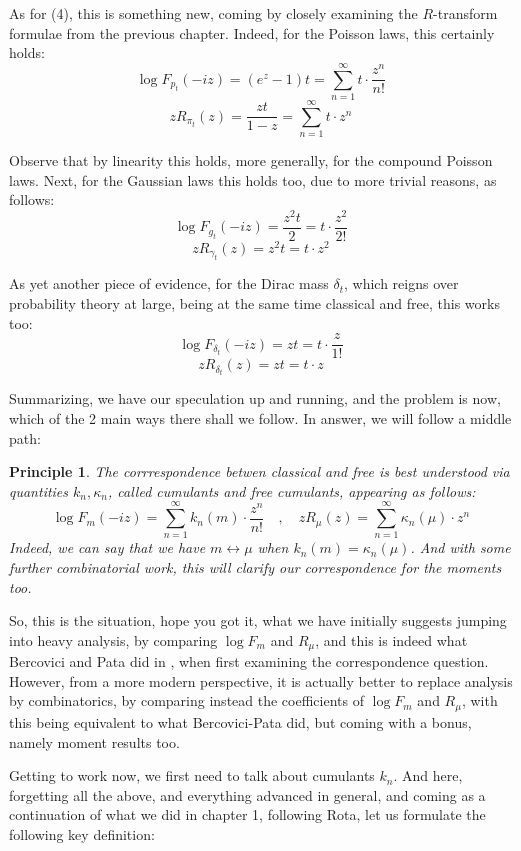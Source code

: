 \documentclass[12pt]{amsbook}
\newtheorem{principle}[theorem]{Principle}
\begin{document}
\bigskip

As for (4), this is something new, coming by closely examining the $R$-transform formulae from the previous chapter. Indeed, for the Poisson laws, this certainly holds:
$$\log F_{p_t}(-iz)=(e^z-1)t=\sum_{n=1}^\infty t\cdot\frac{z^n}{n!}$$
$$zR_{\pi_t}(z)=\frac{zt}{1-z}=\sum_{n=1}^\infty t\cdot z^n$$

Observe that by linearity this holds, more generally, for the compound Poisson laws. Next, for the Gaussian laws this holds too, due to more trivial reasons, as follows:
$$\log F_{g_t}(-iz)=\frac{z^2t}{2}=t\cdot\frac{z^2}{2!}$$
$$zR_{\gamma_t}(z)=z^2t=t\cdot z^2$$

As yet another piece of evidence, for the Dirac mass $\delta_t$, which reigns over probability theory at large, being at the same time classical and free, this works too:
$$\log F_{\delta_t}(-iz)=zt=t\cdot\frac{z}{1!}$$
$$zR_{\delta_t}(z)=zt=t\cdot z$$

Summarizing, we have our speculation up and running, and the problem is now, which of the 2 main ways there shall we follow. In answer, we will follow a middle path:

\begin{principle}
The corrrespondence betwen classical and free is best understood via quantities $k_n,\kappa_n$, called cumulants and free cumulants, appearing as follows:
$$\log F_m(-iz)=\sum_{n=1}^\infty k_n(m)\cdot\frac{z^n}{n!}
\quad,\quad 
zR_\mu(z)=\sum_{n=1}^\infty \kappa_n(\mu)\cdot z^n$$
Indeed, we can say that we have $m\leftrightarrow\mu$ when $k_n(m)=\kappa_n(\mu)$. And with some further combinatorial work, this will clarify our correspondence for the moments too. 
\end{principle} 

So, this is the situation, hope you got it, what we have initially suggests jumping into heavy analysis, by comparing $\log F_m$ and $R_\mu$, and this is indeed what Bercovici and Pata did in \cite{bpa}, when first examining the correspondence question. However, from a more modern perspective, it is actually better to replace analysis by combinatorics, by comparing instead the coefficients of $\log F_m$ and $R_\mu$, with this being equivalent to what Bercovici-Pata did, but coming with a bonus, namely moment results too.

\bigskip

Getting to work now, we first need to talk about cumulants $k_n$. And here, forgetting all the above, and everything advanced in general, and coming as a continuation of what we did in chapter 1, following Rota, let us formulate the following key definition:
\end{document}

